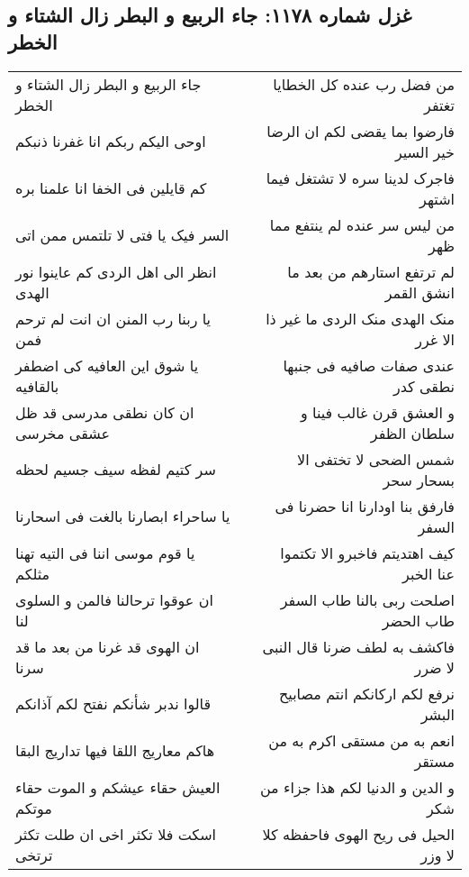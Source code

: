\begin{center}
\section*{غزل شماره ۱۱۷۸: جاء الربیع و البطر زال الشتاء و الخطر}
\label{sec:1178}
\begin{longtable}{l p{0.5cm} r}
جاء الربیع و البطر زال الشتاء و الخطر
&&
من فضل رب عنده کل الخطایا تغتفر
\\
اوحی الیکم ربکم انا غفرنا ذنبکم
&&
فارضوا بما یقضی لکم ان الرضا خیر السیر
\\
کم قایلین فی الخفا انا علمنا بره
&&
فاجرک لدینا سره لا تشتغل فیما اشتهر
\\
السر فیک یا فتی لا تلتمس ممن اتی
&&
من لیس سر عنده لم ینتفع مما ظهر
\\
انظر الی اهل الردی کم عاینوا نور الهدی
&&
لم ترتفع استارهم من بعد ما انشق القمر
\\
یا ربنا رب المنن ان انت لم ترحم فمن
&&
منک الهدی منک الردی ما غیر ذا الا غرر
\\
یا شوق این العافیه کی اضطفر بالقافیه
&&
عندی صفات صافیه فی جنبها نطقی کدر
\\
ان کان نطقی مدرسی قد ظل عشقی مخرسی
&&
و العشق قرن غالب فینا و سلطان الظفر
\\
سر کتیم لفظه سیف جسیم لحظه
&&
شمس الضحی لا تختفی الا بسحار سحر
\\
یا ساحراء ابصارنا بالغت فی اسحارنا
&&
فارفق بنا اودارنا انا حضرنا فی السفر
\\
یا قوم موسی اننا فی التیه تهنا مثلکم
&&
کیف اهتدیتم فاخبرو الا تکتموا عنا الخبر
\\
ان عوقوا ترحالنا فالمن و السلوی لنا
&&
اصلحت ربی بالنا طاب السفر طاب الحضر
\\
ان الهوی قد غرنا من بعد ما قد سرنا
&&
فاکشف به لطف ضرنا قال النبی لا ضرر
\\
قالوا ندبر شأنکم نفتح لکم آذانکم
&&
نرفع لکم ارکانکم انتم مصابیح البشر
\\
هاکم معاریج اللقا فیها تداریج البقا
&&
انعم به من مستقی اکرم به من مستقر
\\
العیش حقاء عیشکم و الموت حقاء موتکم
&&
و الدین و الدنیا لکم هذا جزاء من شکر
\\
اسکت فلا تکثر اخی ان طلت تکثر ترتخی
&&
الحیل فی ریح الهوی فاحفظه کلا لا وزر
\\
\end{longtable}
\end{center}
